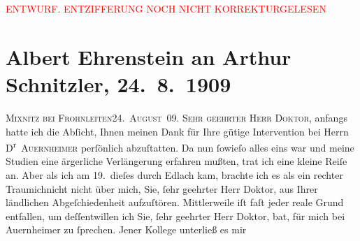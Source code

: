 
\begin{center}
            \textcolor{red}{ENTWURF. ENTZIFFERUNG NOCH NICHT KORREKTURGELESEN}
                      \end{center}
            
               \section[Albert Ehrenstein an Arthur Schnitzler, 24. 8. 1909]{ Albert Ehrenstein an Arthur Schnitzler, 24. 8. 1909}\nopagebreak{}\rehead{ }\begin{ledgroupsized}[t]{13cm}\normalsize\beginnumbering{} \toendnotes[C]{\smallbreak\pagebreak[2]} 
\toendnotes[C]{\smallbreak}\pstart
           {\pb}\textsc{Mixnitz bei Frohnleiten}\hfill \textsc{24. August 09.}\pend
           \pstart{}\textsc{Sehr geehrter Herr Doktor,}\pend\pstart
           anfangs hatte ich die Abſicht, Ihnen meinen Dank für Ihre gütige Intervention bei
                    Herrn D\textsuperscript{r} \textsc{Auernheimer} perſönlich abzuſtatten. Da nun ſowieſo alles eins war und meine Studien
                    eine ärgerliche Verlängerung erfahren mußten, trat ich eine kleine Reiſe an.
                    Aber als ich am 19. dieſes durch Edlach kam, brachte ich es als ein rechter Traumichnicht nicht {\pb}über mich, Sie, ſehr geehrter Herr Doktor, aus Ihrer
                    ländlichen Abgeſchiedenheit aufzuſtören. Mittlerweile iſt faſt jeder reale Grund
                    entfallen, um deſſentwillen ich Sie, ſehr geehrter Herr Doktor, bat, für mich
                    bei Auernheimer zu ſprechen. Jener Kollege unterließ es mir

\end{ledgroupsized}
